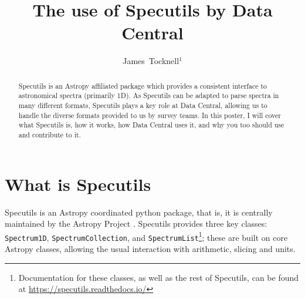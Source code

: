 \documentclass[11pt,twoside]{article}
\begin{document}
\title{The use of Specutils by Data Central}

\author{James~Tocknell$^1$}




  
\begin{abstract}

Specutils is an Astropy affiliated package which provides a consistent interface
to astronomical spectra (primarily 1D). As Specutils can be adapted to parse
spectra in many different formats, Specutils plays a key role at Data Central,
allowing us to handle the diverse formats provided to us by survey teams. In
this poster, I will cover what Specutils is, how it works, how Data Central uses
it, and why you too should use and contribute to it.
  
\end{abstract}

\section{What is Specutils}

Specutils \citep{2019ascl.soft02012A} is an Astropy coordinated python package,
that is, it is centrally maintained by the Astropy Project
\citep{2013A&A...558A..33A,2018AJ....156..123A,2022ApJ...935..167A}.
Specutils provides three key classes:
\texttt{Spectrum1D}, \texttt{SpectrumCollection}, and
\texttt{SpectrumList}\footnote{Documentation for these classes, as well as the
  rest of Specutils, can be found at \url{https://specutils.readthedocs.io/}};
these are built on core Astropy classes, allowing the usual interaction with
arithmetic, slicing and units.
\end{document}

